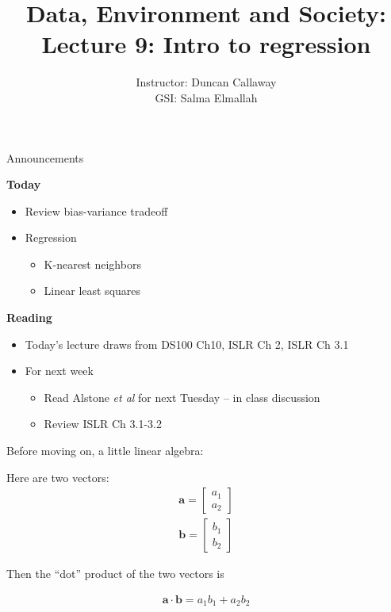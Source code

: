 \documentclass[aspectratio=169]{beamer}
\title[Lecture 9: Regression] %
{Data, Environment and Society: \\{Lecture 9: Intro to regression}}
\author[ER131: Data, Environment and Society] 
{Instructor: Duncan Callaway\\
GSI: Salma Elmallah}
\institute[UC Berkeley] %
 {\small{ \bf September 26, 2019}}
\date[September 26, 2019]
\begin{document}
\begin{frame}
  \titlepage
\end{frame}

\begin{frame}{Announcements}

\textbf{Today}
\begin{itemize}
\item Review bias-variance tradeoff
\item Regression
\begin{itemize}
	\item K-nearest neighbors
	\item Linear least squares
\end{itemize}
\end{itemize}

\textbf{Reading}
\begin{itemize}
\item Today's lecture draws from DS100 Ch10, ISLR Ch 2, ISLR Ch 3.1
\item For next week
\begin{itemize}
\item Read Alstone \textit{et al} for next Tuesday -- in class discussion
\item Review ISLR Ch 3.1-3.2
\end{itemize}
\end{itemize}

\end{frame}

\begin{frame}{Before moving on, a little linear algebra:}

Here are two vectors:  
\begin{align*}
\mathbf{a} =  
\begin{bmatrix} 
	a_1 \\
	a_2  
\end{bmatrix}\\
\mathbf{b}=
 \begin{bmatrix}
	b_1\\
	b_2
\end{bmatrix} 
\end{align*}

Then the ``dot'' product of the two vectors is

\begin{align*}
\mathbf{a}\cdot \mathbf{b} = a_1b_1 + a_2b_2
\end{align*}

\end{frame}
\end{document}
